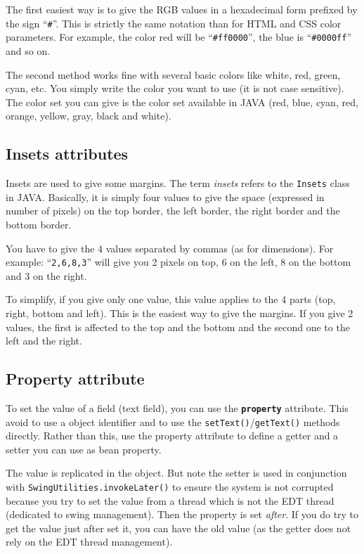 \documentclass[a4paper,onecolumn,10pt]{book}
\newcommand{\jmethod}[1]{\texttt{\small #1()}}
\newcommand{\jclass}[1]{\texttt{\small #1}}
\newcommand{\attr}[1]{\texttt{\small \textbf{#1}}}
\begin{document}
The first easiest way is to give the RGB values in a hexadecimal
form prefixed by the sign ``\verb|#|''. This is strictly the same
notation than for HTML and CSS color parameters. For example, the color
red will be ``\verb|#ff0000|'', the blue is ``\verb|#0000ff|'' and so
on.

The second method works fine with several basic colors like white, red,
green, cyan, etc. You simply write the color you want to use (it is not
case sensitive). The color set you can give is the color set available
in JAVA (red, blue, cyan, red, orange, yellow, gray, black and white).

\subsection{Insets attributes}
Insets are used to give some margins. The term \emph{insets} refers to
the \jclass{Insets} class in JAVA. Basically, it is simply four values
to give the space (expressed in number of pixels) on the top border, the
left border, the right border and the bottom border.

You have to give the 4 values separated by commas (as for dimensions). For
example: ``\verb|2,6,8,3|'' will give you 2 pixels on top, 6 on the left,
8 on the bottom and 3 on the right.

To simplify, if you give only one value, this value applies to the 4 parts
(top, right, bottom and left). This is the easiest way to give the margins.
If you give 2 values, the first is affected to the top and the bottom and
the second one to the left and the right.


\subsection{Property attribute}
To set the value of a field (text field), you can use the \attr{property}
attribute. This avoid to use a object identifier and to use the 
\jmethod{setText}/\jmethod{getText} methods directly. Rather than this, use
the property attribute to define a getter and a setter you can use as bean
property.

The value is replicated in the object. But note the setter is used in
conjunction with \jmethod{SwingUtilities.invokeLater} to ensure the
system is not corrupted because you try to set the value from a thread which is
not the EDT thread (dedicated to swing management). Then the property is
set \emph{after}. If you do try to get the value just after set it, you can
have the old value (as the getter does not rely on the EDT thread management).
\end{document}
